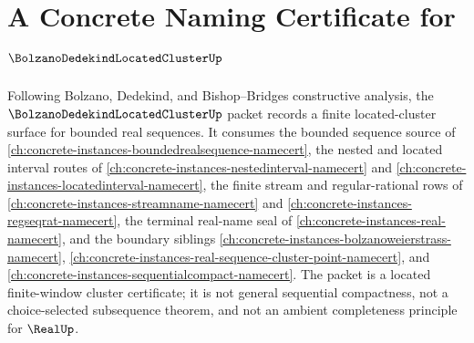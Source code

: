 \chapter{A Concrete Naming Certificate for $\BolzanoDedekindLocatedClusterUp$}
\label{ch:concrete-instances-bolzano-dedekind-located-cluster-namecert}

Following Bolzano, Dedekind, and Bishop--Bridges constructive analysis, the $\BolzanoDedekindLocatedClusterUp$ packet records a finite located-cluster surface for bounded real sequences. It consumes the bounded sequence source of \autoref{ch:concrete-instances-boundedrealsequence-namecert}, the nested and located interval routes of \autoref{ch:concrete-instances-nestedinterval-namecert} and \autoref{ch:concrete-instances-locatedinterval-namecert}, the finite stream and regular-rational rows of \autoref{ch:concrete-instances-streamname-namecert} and \autoref{ch:concrete-instances-regseqrat-namecert}, the terminal real-name seal of \autoref{ch:concrete-instances-real-namecert}, and the boundary siblings \autoref{ch:concrete-instances-bolzanoweierstrass-namecert}, \autoref{ch:concrete-instances-real-sequence-cluster-point-namecert}, and \autoref{ch:concrete-instances-sequentialcompact-namecert}. The packet is a located finite-window cluster certificate; it is not general sequential compactness, not a choice-selected subsequence theorem, and not an ambient completeness principle for $\RealUp$.

